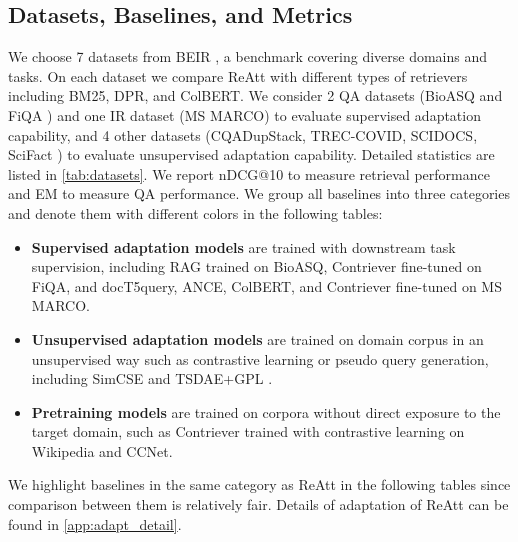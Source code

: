 \documentclass[11pt, dvipsnames]{article}
\newcommand{\ours}{ReAtt\xspace}
\newcommand{\msm}{MS MARCO\xspace}
\begin{document}
\subsection{Datasets, Baselines, and Metrics}
We choose 7 datasets from BEIR \cite{beir-2021-thakur}, a benchmark covering diverse domains and tasks.
On each dataset we compare \ours with different types of retrievers including BM25, DPR, and ColBERT.
We consider 2 QA datasets (BioASQ and FiQA \cite{bioasq-2015-tsatsaronis,fiqa-2018-maia}) and one IR dataset (\msm \cite{msmarco-2016-nguyen}) to evaluate supervised adaptation capability, and 4 other datasets (CQADupStack, TREC-COVID, SCIDOCS, SciFact \cite{cqa-2015-hoogeveen,treccovid-2020-voorhees,scidocs-2020-cohan,scifact-2020-wadden}) to evaluate unsupervised adaptation capability.
Detailed statistics are listed in \autoref{tab:datasets}.
We report nDCG@10 to measure retrieval performance and EM to measure QA performance.
We group all baselines into three categories and denote them with different colors in the following tables:
\begin{itemize}[leftmargin=*]
\item \textbf{Supervised adaptation models} are trained with downstream task supervision, including RAG trained on BioASQ, Contriever fine-tuned on FiQA, and docT5query, ANCE, ColBERT, and Contriever fine-tuned on \msm \cite{doct5query-2019-nogueira,ance-2021-xiong,colbert-2020-khattab,contriver-2021-izacard}.
\item \textbf{Unsupervised adaptation models} are trained on domain corpus in an unsupervised way such as contrastive learning or pseudo query generation, including SimCSE and TSDAE+GPL \cite{simcse-2021-gao,tsdae-2021-wang,gpl-2021-wang}.
\item \textbf{Pretraining models} are trained on corpora without direct exposure to the target domain, such as Contriever \cite{contriver-2021-izacard} trained with contrastive learning on Wikipedia and CCNet.
\end{itemize}
We highlight baselines in the same category as \ours in the following tables since comparison between them is relatively fair.
Details of adaptation of \ours can be found in \autoref{app:adapt_detail}.
\end{document}
